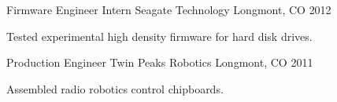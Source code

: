 \begin{cventries}
  \cventry
    {Firmware Engineer Intern} %
    {Seagate Technology} %
    {Longmont, CO} %
    {2012} %
    {
      \begin{cvitems} %
        \item {Tested experimental high density firmware for hard disk drives.}
      \end{cvitems}
    }

  \cventry
    {Production Engineer} %
    {Twin Peaks Robotics} %
    {Longmont, CO} %
    {2011} %
    {
      \begin{cvitems} %
        \item {Assembled radio robotics control chipboards.}
      \end{cvitems}
    }
   
\end{cventries}
